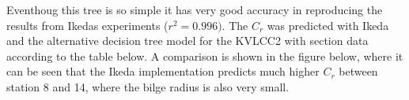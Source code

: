     \begin{figure}
        \begin{center}\end{center}
        \caption{}
        \label{fig:}
    \end{figure}
    
    Eventhoug this tree is so simple it has very good accuracy in
reproducing the results from Ikedas experiments (\(r^2=0.996)\). The
\(C_r\) was predicted with Ikeda and the alternative decision tree model
for the KVLCC2 with section data according to the table below. A
comparison is shown in the figure below, where it can be seen that the
Ikeda implementation predicts much higher \(C_r\) between station 8 and
14, where the bilge radius is also very small.
 
            
    
